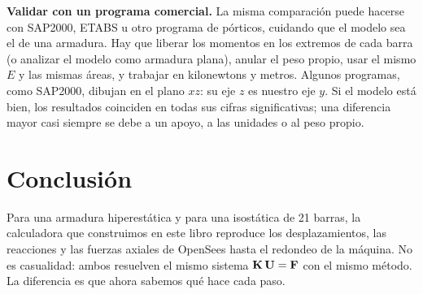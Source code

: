 \begin{parasabermas}
  \textbf{Validar con un programa comercial.} La misma comparación puede
  hacerse con SAP2000, ETABS u otro programa de pórticos, cuidando que el
  modelo sea el de una armadura. Hay que liberar los momentos en los extremos
  de cada barra (o analizar el modelo como armadura plana), anular el peso
  propio, usar el mismo $E$ y las mismas áreas, y trabajar en kilonewtons y
  metros. Algunos programas, como SAP2000, dibujan en el plano $xz$: su eje
  $z$ es nuestro eje $y$. Si el modelo está bien, los resultados coinciden en
  todas sus cifras significativas; una diferencia mayor casi siempre se debe
  a un apoyo, a las unidades o al peso propio.
\end{parasabermas}

\FloatBarrier

\section{Conclusión}\label{sec:d_conclusion}

Para una armadura hiperestática y para una isostática de 21 barras, la
calculadora que construimos en este libro reproduce los desplazamientos, las
reacciones y las fuerzas axiales de OpenSees hasta el redondeo de la máquina.
No es casualidad: ambos resuelven el mismo sistema $\mathbf{K}\,\mathbf{U} = \mathbf{F}$ con el
mismo método. La diferencia es que ahora sabemos qué hace cada paso.
